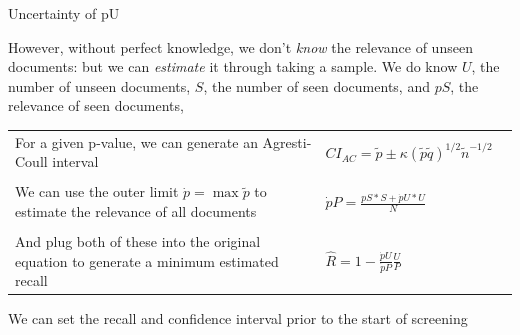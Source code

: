 \documentclass[9pt]{beamer}
\begin{document}
\begin{frame}{Uncertainty of pU}

 However, without perfect knowledge, we don't \textit{know} the relevance of unseen documents: but we can \textit{estimate} it through taking a sample. We do know \(U\), the number of unseen documents, \(S\), the number of seen documents, and \( pS \), the relevance of seen documents, 
 
 \bigskip
\begin{tabular}{p{0.618\linewidth} p{0.382\linewidth}}
 For a given p-value, we can generate an Agresti-Coull interval & 
 \( CI_{AC} = \tilde{p} \pm \kappa(\tilde{p}\tilde{q})^{1/2}\tilde{n}^{-1/2} \) \\
  & \\
 We can use the outer limit \( \dot{p} = \max\tilde{p} \) to estimate the relevance of all documents 
  &  \( \dot{p}P = \frac{pS*S + \dot{p}U*U}{N}  \) \\
  & \\
 And plug both of these into the original equation to generate a minimum estimated recall & 
 \( \hat{R} = 1- \frac{\dot{p}U}{\dot{p}P} \frac{U}{P} \)
 
\end{tabular}

\bigskip

We can set the recall and confidence interval prior to the start of screening

\end{frame}
\end{document}
